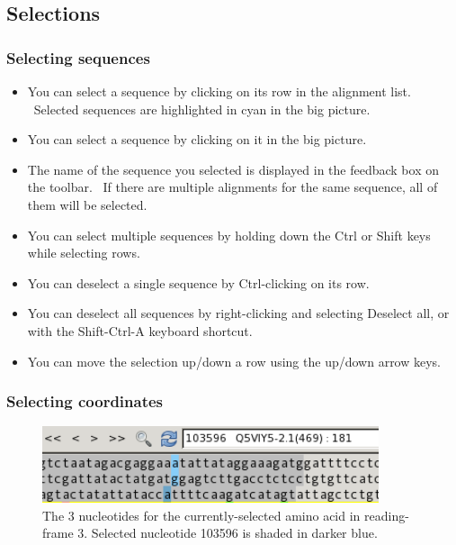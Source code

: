 \documentclass[letterpaper]{article}
\newcommand\liststyleWWviiiNumxxxv{%
\renewcommand\labelitemi{{\textbullet}}
\renewcommand\labelitemii{o}
\renewcommand\labelitemiii{[F0A7?]}
\renewcommand\labelitemiv{[F0B7?]}
}
\begin{document}
{\color[rgb]{0.30980393,0.5058824,0.7411765}\subsection[Selections]{Selections}}
\hypertarget{RefHeading1901056909880}{}
{\color[rgb]{0.30980393,0.5058824,0.7411765}\subsubsection[Selecting sequences]{Selecting sequences}}
\hypertarget{RefHeading1921056909880}{}
\liststyleWWviiiNumxxxv
\begin{itemize}
\item {
You can select a sequence by clicking on its row in the alignment list.
\ Selected sequences are highlighted in cyan in the big picture.}
\item {
You can select a sequence by clicking on it in the big picture.}
\item {
The name of the sequence you selected is displayed in the feedback box
on the toolbar. \ If there are multiple alignments for the same
sequence, all of them will be selected.}
\item {
You can select multiple sequences by holding down the Ctrl or Shift keys
while selecting rows.}
\item {
You can deselect a single sequence by Ctrl-clicking on its row.}
\item {
You can deselect all sequences by right-clicking and selecting
{\textquotesingle}Deselect all{\textquotesingle}, or with the
Shift-Ctrl-A keyboard shortcut.}
\item {
You can move the selection up/down a row using the up/down arrow keys.}
\end{itemize}

{\color[rgb]{0.30980393,0.5058824,0.7411765}\subsubsection[Selecting coordinates]{Selecting coordinates}}
\hypertarget{RefHeading1941056909880}{}

\begin{figure}
\centering
\color[rgb]{0.30980393,0.5058824,0.7411765}
\includegraphics[width=9.904cm,height=2.244cm]{img_view_selected_codon.png}
\caption{ The 3 nucleotides for the
currently-selected amino acid in reading-frame 3. Selected nucleotide
103596 is shaded in darker blue.}
\end{figure}
\end{document}
